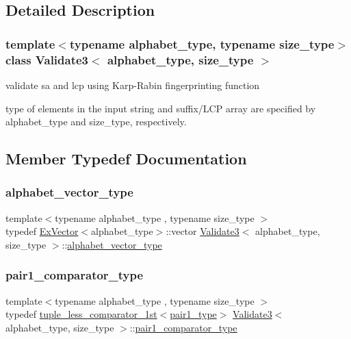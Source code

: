 \subsection{Detailed Description}
\subsubsection*{template$<$typename alphabet\+\_\+type, typename size\+\_\+type$>$\newline
class Validate3$<$ alphabet\+\_\+type, size\+\_\+type $>$}

validate sa and lcp using Karp-\/\+Rabin fingerprinting function 

type of elements in the input string and suffix/\+L\+CP array are specified by alphabet\+\_\+type and size\+\_\+type, respectively. 

\subsection{Member Typedef Documentation}
\mbox{\label{class_validate3_a7a893a89f745710a34958b37717cb024}} 
\subsubsection{\texorpdfstring{alphabet\+\_\+vector\+\_\+type}{alphabet\_vector\_type}}
{\footnotesize\ttfamily template$<$typename alphabet\+\_\+type , typename size\+\_\+type $>$ \\
typedef \hyperlink{struct_ex_vector}{Ex\+Vector}$<$alphabet\+\_\+type$>$\+::vector \hyperlink{class_validate3}{Validate3}$<$ alphabet\+\_\+type, size\+\_\+type $>$\+::\hyperlink{class_validate3_a7a893a89f745710a34958b37717cb024}{alphabet\+\_\+vector\+\_\+type}\hspace{0.3cm}{\ttfamily [private]}}

\mbox{\label{class_validate3_ace20fdc998ec6fb2c559aaf7413d464e}} 
\subsubsection{\texorpdfstring{pair1\+\_\+comparator\+\_\+type}{pair1\_comparator\_type}}
{\footnotesize\ttfamily template$<$typename alphabet\+\_\+type , typename size\+\_\+type $>$ \\
typedef \hyperlink{structtuple__less__comparator__1st}{tuple\+\_\+less\+\_\+comparator\+\_\+1st}$<$\hyperlink{class_validate3_abecec0e807ea06aac66c60387611e78a}{pair1\+\_\+type}$>$ \hyperlink{class_validate3}{Validate3}$<$ alphabet\+\_\+type, size\+\_\+type $>$\+::\hyperlink{class_validate3_ace20fdc998ec6fb2c559aaf7413d464e}{pair1\+\_\+comparator\+\_\+type}\hspace{0.3cm}{\ttfamily [private]}}

